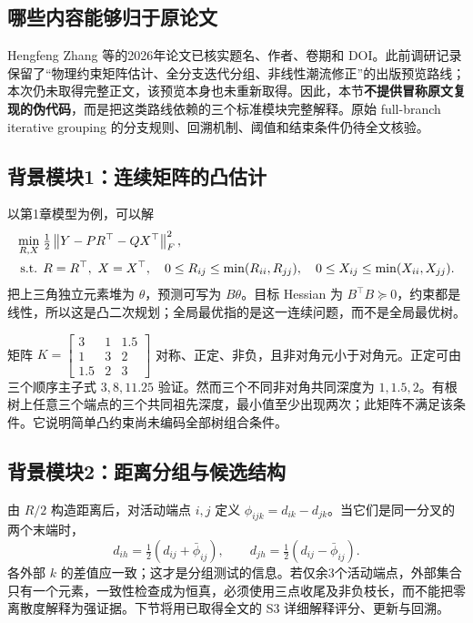 \subsection{哪些内容能够归于原论文}
Hengfeng Zhang 等的2026年论文\citep{S2}已核实题名、作者、卷期和 DOI。此前调研记录保留了“物理约束矩阵估计、全分支迭代分组、非线性潮流修正”的出版预览路线；本次仍未取得完整正文，该预览本身也未重新取得。因此，本节\textbf{不提供冒称原文复现的伪代码}，而是把这类路线依赖的三个标准模块完整解释。原始 full-branch iterative grouping 的分支规则、回溯机制、阈值和结束条件仍待全文核验。

\subsection{背景模块1：连续矩阵的凸估计}
以第1章模型为例，可以解
\begin{align}
 \min_{R,X}\;&\tfrac12\left\lVert Y-PR^\top-QX^\top\right\rVert_F^2,\\
 \text{s.t. }&R=R^\top,\ X=X^\top,
 \quad0\leq R_{ij}\leq\min(R_{ii},R_{jj}),
 \quad0\leq X_{ij}\leq\min(X_{ii},X_{jj}).
 \label{eq:tb-s2-generic}
\end{align}
把上三角独立元素堆为 $\theta$，预测可写为 $B\theta$。目标 Hessian 为 $B^\top B\succeq0$，约束都是线性，所以这是凸二次规划；全局最优指的是这一连续问题，而不是全局最优树。

\begin{example}[满足简单物理不等式仍不一定是共同路径矩阵]
矩阵 $K=\left[\begin{smallmatrix}3&1&1.5\\1&3&2\\1.5&2&3\end{smallmatrix}\right]$ 对称、正定、非负，且非对角元小于对角元。正定可由三个顺序主子式 $3,8,11.25$ 验证。然而三个不同非对角共同深度为 $1,1.5,2$。有根树上任意三个端点的三个共同祖先深度，最小值至少出现两次；此矩阵不满足该条件。它说明简单凸约束尚未编码全部树组合条件。
\end{example}

\subsection{背景模块2：距离分组与候选结构}
由 $R/2$ 构造距离后，对活动端点 $i,j$ 定义
$\phi_{ijk}=d_{ik}-d_{jk}$。当它们是同一分叉的两个末端时，
\begin{equation}
 d_{ih}=\tfrac12(d_{ij}+\bar\phi_{ij}),\qquad
 d_{jh}=\tfrac12(d_{ij}-\bar\phi_{ij}).
 \label{eq:tb-limb}
\end{equation}
各外部 $k$ 的差值应一致；这才是分组测试的信息。若仅余3个活动端点，外部集合只有一个元素，一致性检查成为恒真，必须使用三点收尾及非负枝长，而不能把零离散度解释为强证据。下节将用已取得全文的 S3 详细解释评分、更新与回溯。

